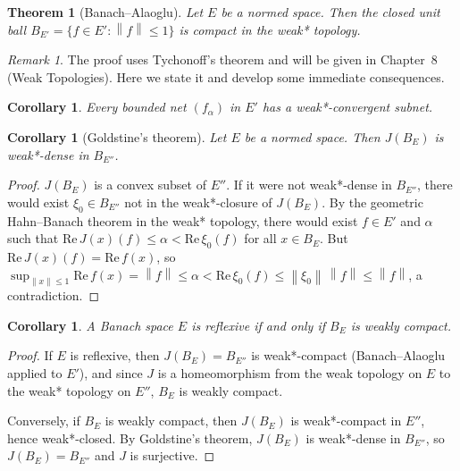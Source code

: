 \documentclass[a4paper,12pt]{book}
\newcommand{\norm}[1]{\left\| #1 \right\|}
\theoremstyle{definition}
\theoremstyle{plain}
\newtheorem{theorem}[definition]{Theorem}
\newtheorem{corollary}[definition]{Corollary}
\theoremstyle{remark}
\newtheorem{remark}[definition]{Remark}
\begin{document}
\begin{theorem}[Banach--Alaoglu]\label{thm:banach-alaoglu}
Let $E$ be a normed space. Then the closed unit ball
$B_{E'} = \{f\in E':\norm{f}\leq 1\}$ is compact in the weak* topology.
\end{theorem}

\begin{remark}\label{rem:alaoglu-proof-deferred}
The proof uses Tychonoff's theorem and will be given in Chapter~8 (Weak
Topologies). Here we state it and develop some immediate consequences.
\end{remark}

\begin{corollary}\label{cor:alaoglu-bounded}
Every bounded net $(f_\alpha)$ in $E'$ has a weak*-convergent subnet.
\end{corollary}

\begin{corollary}[Goldstine's theorem]\label{cor:goldstine}
Let $E$ be a normed space. Then $J(B_E)$ is weak*-dense in $B_{E''}$.
\end{corollary}

\begin{proof}
$J(B_E)$ is a convex subset of $E''$. If it were not weak*-dense in $B_{E''}$,
there would exist $\xi_0\in B_{E''}$ not in the weak*-closure of $J(B_E)$.
By the geometric Hahn--Banach theorem in the weak* topology, there would exist
$f\in E'$ and $\alpha$ such that $\mathrm{Re}\,J(x)(f)\leq\alpha<\mathrm{Re}\,\xi_0(f)$
for all $x\in B_E$. But $\mathrm{Re}\,J(x)(f)=\mathrm{Re}\,f(x)$, so
$\sup_{\norm{x}\leq 1}\mathrm{Re}\,f(x)=\norm{f}\leq\alpha<\mathrm{Re}\,\xi_0(f)
\leq\norm{\xi_0}\,\norm{f}\leq\norm{f}$, a contradiction.
\end{proof}

\begin{corollary}\label{cor:reflexive-alaoglu}
A Banach space $E$ is reflexive if and only if $B_E$ is weakly compact.
\end{corollary}

\begin{proof}
If $E$ is reflexive, then $J(B_E)=B_{E''}$ is weak*-compact (Banach--Alaoglu
applied to $E'$), and since $J$ is a homeomorphism from the weak topology on
$E$ to the weak* topology on $E''$, $B_E$ is weakly compact.

Conversely, if $B_E$ is weakly compact, then $J(B_E)$ is weak*-compact in
$E''$, hence weak*-closed. By Goldstine's theorem, $J(B_E)$ is weak*-dense in
$B_{E''}$, so $J(B_E)=B_{E''}$ and $J$ is surjective.
\end{proof}
\end{document}

